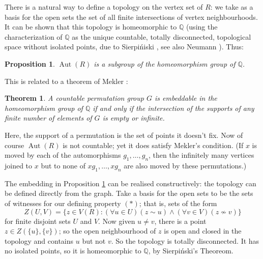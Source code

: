 \documentclass{book}
\newtheorem{theorem}{Theorem}
\newtheorem{proposition}{Proposition}
\DeclareMathOperator{\Aut}{Aut}
\begin{document}
There is a natural way to define a topology on the vertex set of
$R$: we take as a basis for the open sets the set of all finite
intersections of vertex neighbourhoods. It can be shown that this
topology is homeomorphic to $\mathbb{Q}$ (using the characterization
of $\mathbb{Q}$ as the unique countable, totally disconnected,
topological space without isolated points, due to Sierpi\'{n}iski
\cite{ch32:bib48}, see also Neumann \cite{ch32:bib38}). Thus:

\begin{proposition}\label{ch32:prop9.1} 
$\Aut(R)$ is a subgroup of the homeomorphism group of $\mathbb{Q}$.
\end{proposition}

This is related to a theorem of Mekler \cite{ch32:bib36}:

\begin{theorem}\label{ch32:them9.1} 
A countable permutation group $G$ is embeddable
in the homeomorphism group of $\mathbb{Q}$ if and only if the
intersection of the supports of any finite number of elements of $G$
is empty or infinite.
\end{theorem}

Here, the support of a permutation is the set of points it doesn't
fix. Now of course $\Aut(R)$ is not countable; yet it does
satisfy Mekler's condition. (If $x$ is moved by each of the
automorphisms $g_1,\ldots,g_n$, then the infinitely many vertices
joined to $x$ but to none of $xg_1,\ldots, xg_n$ are also moved by
these permutations.)

The embedding in Proposition \ref{ch32:prop9.1} can be realised constructively:
the topology can be defined directly from the graph. Take a basis for the
open sets to be the sets of witnesses for our defining property $(*)$; that is, 
sets of the form
\[Z(U,V)=\{z\in V(R): (\forall u\in U)(z\sim u) \wedge (\forall v\in V)(z \not \sim v)\}\]
for finite disjoint sets $U$ and $V$. Now given $u\ne v$, there is a point
$z\in Z(\{u\},\{v\})$; so the open neighbourhood of $z$ is open and closed in
the topology and contains $u$ but not $v$. So the topology is totally
disconnected. It has no isolated points, so it is homeomorphic to $\mathbb{Q}$,
by Sierpi\'nski's Theoreom.
\end{document}
